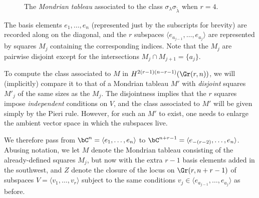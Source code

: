 \begin{figure}
\caption{The \emph{Mondrian tableau} associated to the class $\sigma_\lambda\sigma_{\widetilde{\lambda}}$ when $r=4$.}\label{mondrian1}
\end{figure}
The basis elements $e_{1},\ldots,e_{n}$ (represented just by the subscripts for brevity) are recorded along on the diagonal, and the $r$ subspaces $\langle e_{a_{j-1}},\ldots,e_{a_j}\rangle$ are represented by squares $M_j$ containing the corresponding indices. Note that the $M_j$ are pairwise disjoint except for the intersections $M_j\cap M_{j+1}=\{a_j\}$. 

To compute the class associated to $M$ in $H^{2(r-1)(n-r-1)}(\Gr(r,n))$, we will (implicitly) compare it to that of a Mondrian tableau $M'$ with \emph{disjoint} squares $M'_j$ of the same sizes as the $M_j$. The disjointness implies that the $r$ squares impose \emph{independent} conditions on $V$, and the class associated to $M'$ will be given simply by the Pieri rule. However, for such an $M'$ to exist, one needs to enlarge the ambient vector space in which the subspaces live. 

We therefore pass from $\bC^n=\langle e_1,\ldots,e_n\rangle$ to $\bC^{n+r-1}=\langle e_{-(r-2)},\ldots,e_n\rangle$. Abusing notation, we let $M$ denote the Mondrian tableau consisting of the already-defined squares $M_j$, but now with the extra $r-1$ basis elements added in the southwest, and $Z$ denote the closure of the locus on $\Gr(r,n+r-1)$ of subspaces $V=\langle v_1,\ldots,v_r\rangle$ subject to the same conditions $v_j\in \langle e_{a_{j-1}},\ldots,e_{a_j}\rangle$ as before.

